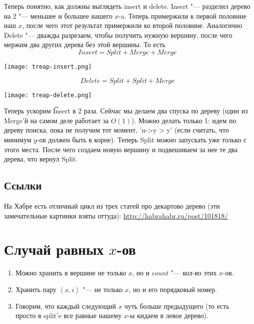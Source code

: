 Теперь понятно, как должны выглядеть insert и delete.
Insert "--- разделил дерево на 2 "--- меньшее и большее нашего $x$-a.
Теперь примержили к первой половине наш $x$, после чего этот результат примержили ко второй половине.
Аналогично Delete "--- дважды разрезаем, чтобы получить нужную вершину, после чего мержим два других дерева без этой вершины.
То есть
\[ Insert = Split + Merge + Merge \]
\begin{center} \texttt{[image: treap-insert.png]} \end{center}
\[ Delete = Split + Split + Merge \]
\begin{center} \texttt{[image: treap-delete.png]} \end{center}

Теперь ускорим \t{Insert} в 2 раза.
Сейчас мы делаем два спуска по дереву (один из Merge'й на самом деле работает за $O(1)$).
Можно делать только 1: идем по дереву поиска, пока не получим тот момент, \cpp'n->y > y'
(если считать, что минимум $y$-ов должен быть в корне).
Теперь Split можно запускать уже только с этого места.
После чего создаем новую вершину и подвешиваем за нее те два дерева, что вернул Split.

\subsection{Ссылки}

На Хабре есть отличный цикл из трех статей про декартово дерево (эти замечательные картинки взяты оттуда):
\href{http://habrahabr.ru/post/101818/}{http://habrahabr.ru/post/101818/}

\section[Случай равных x-ов]{Случай равных $x$-ов}

\begin{enumerate}
	\item Можно хранить в вершине не только $x$, но и $count$ "--- кол-во этих $x$-ов.
	\item Хранить пару $\left<x, i\right>$ "--- не только $x$, но и его порядковый номер.
	\item Говорим, что каждый следующий $x$ чуть больше предыдущего (то есть просто в split'e все равные нашему $x$-ы кидаем в левое дерево).
\end{enumerate}
